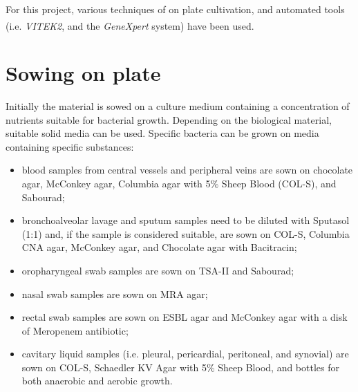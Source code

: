 \documentclass[11pt]{report}
\begin{document}
For this project, various techniques of on plate cultivation, and automated tools (i.e. \emph{VITEK}\textsuperscript{\textregistered}\emph{2}, and the \emph{GeneXpert} system) have been used.

\section{Sowing on plate}
Initially the material is sowed on a culture medium containing a concentration of nutrients suitable for bacterial growth.
Depending on the biological material, suitable solid media can be used. 
Specific bacteria can be grown on media containing specific substances:
\begin{itemize}
\item blood samples from central vessels and peripheral veins are sown on chocolate agar, McConkey agar, Columbia agar with 5$\%$ Sheep Blood (COL-S), and Sabourad;
\item bronchoalveolar lavage and sputum samples need to be diluted with Sputasol (1:1) and, if the sample is considered suitable, are sown on COL-S, Columbia CNA agar, McConkey agar, and Chocolate agar with Bacitracin;
\item oropharyngeal swab samples are sown on TSA-II and Sabourad;
\item nasal swab samples are sown on MRA agar;
\item rectal swab samples are sown on ESBL agar and McConkey agar with a disk of Meropenem antibiotic;
\item cavitary liquid samples (i.e. pleural, pericardial, peritoneal, and synovial) are sown on COL-S, Schaedler KV Agar with 5$\%$ Sheep Blood, and bottles for both anaerobic and aerobic growth.
\end{itemize}
\end{document}
